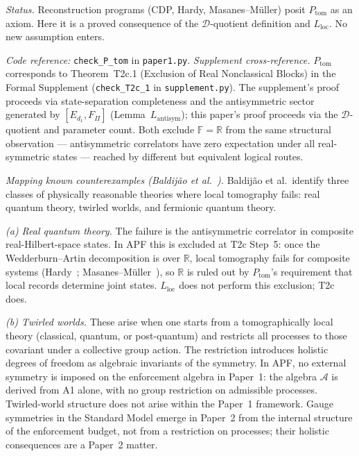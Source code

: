 \documentclass[11pt]{article}
\theoremstyle{remark}
\newcommand{\coderef}[2]{\smallskip\noindent\textit{Code reference:} \texttt{#1} in \texttt{#2}.}
\begin{document}
\begin{tcolorbox}[apfbox, title={$P_{\mathrm{tom}}$: Local Tomographic Closure}]
\smallskip\noindent\textit{Status.}  Reconstruction programs (CDP, Hardy, Masanes--M\"uller) posit $P_{\mathrm{tom}}$ as an axiom.  Here it is a proved consequence of the $\mathcal{D}$-quotient definition and $L_{\mathrm{loc}}$.  No new assumption enters.

\coderef{check\_P\_tom}{paper1.py}
\smallskip\noindent\textit{Supplement cross-reference.}  $P_{\mathrm{tom}}$ corresponds to Theorem~T2c.1 (Exclusion of Real Nonclassical Blocks) in the Formal Supplement (\texttt{check\_T2c\_1} in \texttt{supplement.py}).  The supplement's proof proceeds via state-separation completeness and the antisymmetric sector generated by $[E_{d_1}, F_\Pi]$ (Lemma~$L_{\mathrm{antisym}}$); this paper's proof proceeds via the $\mathcal{D}$-quotient and parameter count.  Both exclude $\mathbb{F} = \mathbb{R}$ from the same structural observation --- antisymmetric correlators have zero expectation under all real-symmetric states --- reached by different but equivalent logical routes.
\end{tcolorbox}

\smallskip\noindent\textit{Mapping known counterexamples (Baldij\~ao et al.~\cite{Baldiijao2026}).}  Baldij\~ao et al.\ identify three classes of physically reasonable theories where local tomography fails: real quantum theory, twirled worlds, and fermionic quantum theory.

\textit{(a) Real quantum theory.}  The failure is the antisymmetric correlator in composite real-Hilbert-space states.  In APF this is excluded at T2c Step~5: once the Wedderburn--Artin decomposition is over $\mathbb{R}$, local tomography fails for composite systems (Hardy~\cite{Hardy2001}; Masanes--M\"{u}ller~\cite{MM2011}), so $\mathbb{R}$ is ruled out by $P_{\mathrm{tom}}$'s requirement that local records determine joint states.  $L_{\mathrm{loc}}$ does not perform this exclusion; T2c does.

\textit{(b) Twirled worlds.}  These arise when one starts from a tomographically local theory (classical, quantum, or post-quantum) and restricts all processes to those covariant under a collective group action.  The restriction introduces holistic degrees of freedom as algebraic invariants of the symmetry.  In APF, no external symmetry is imposed on the enforcement algebra in Paper~1: the algebra $\mathcal{A}$ is derived from A1 alone, with no group restriction on admissible processes.  Twirled-world structure does not arise within the Paper~1 framework.  Gauge symmetries in the Standard Model emerge in Paper~2 from the internal structure of the enforcement budget, not from a restriction on processes; their holistic consequences are a Paper~2 matter.
\end{document}
